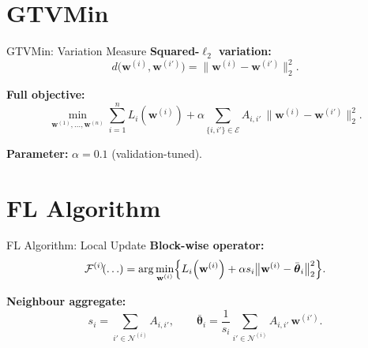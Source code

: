 \documentclass[12pt]{beamer}
\newcommand{\nodeidx}{i}
\newcommand{\nrnodes}{n}
\newcommand{\edges}{\mathcal{E}}
\newcommand{\edgeweight}{A}
\newcommand{\fixedpointop}{\mathcal{F}}
\newcommand{\neighbourhood}[1]{\mathcal{N}^{(#1)}}
\newcommand{\localparams}[1]{\mathbf{w}^{(#1)}}
\newcommand{\locallossfunc}[2]{L_{#1}\!\left(#2\right)}
\begin{document}
\section{GTVMin}

\begin{frame}{GTVMin: Variation Measure}
\textbf{Squared-$\ell_2$ variation:}
\[
    d\bigl(\localparams{\nodeidx},\localparams{\nodeidx'}\bigr)
    = \bigl\|\localparams{\nodeidx} - \localparams{\nodeidx'}\bigr\|_{2}^{2}.
\]

\vspace{4mm}
\textbf{Full objective:}
\[
    \min_{\localparams{1},\ldots,\localparams{\nrnodes}}
    \sum_{\nodeidx=1}^{\nrnodes} \locallossfunc{\nodeidx}{\localparams{\nodeidx}}
    + \alpha\!\!\sum_{\{\nodeidx,\nodeidx'\}\in\edges}\!\!
    \edgeweight_{\nodeidx,\nodeidx'}\,
    \bigl\|\localparams{\nodeidx} - \localparams{\nodeidx'}\bigr\|_{2}^{2}.
\]

\vspace{4mm}
\textbf{Parameter:} $\alpha = 0.1$ (validation-tuned).
\end{frame}


\section{FL Algorithm}

\begin{frame}{FL Algorithm: Local Update}
\textbf{Block-wise operator:}
\[
    \fixedpointop^{(\nodeidx)}\!(\ldots)
    = \arg\min_{\localparams{\nodeidx}}
    \Bigl\{
    \locallossfunc{\nodeidx}{\localparams{\nodeidx}}
    + \alpha s_{\nodeidx}
    \bigl\|\localparams{\nodeidx} - \bar{\boldsymbol{\theta}}_{\nodeidx}\bigr\|_{2}^{2}
    \Bigr\}.
\]

\vspace{4mm}
\textbf{Neighbour aggregate:}
\[
    s_{\nodeidx} = \!\!\sum_{\nodeidx'\in\neighbourhood{\nodeidx}}\!\!
    \edgeweight_{\nodeidx,\nodeidx'},
    \qquad
    \bar{\boldsymbol{\theta}}_{\nodeidx}
    = \frac{1}{s_{\nodeidx}}
    \!\!\sum_{\nodeidx'\in\neighbourhood{\nodeidx}}\!\!
    \edgeweight_{\nodeidx,\nodeidx'}\,\localparams{\nodeidx'}.
\]
\end{frame}
\end{document}
